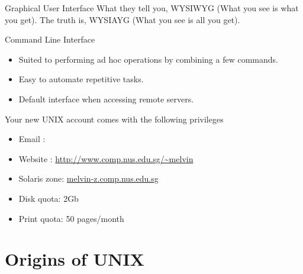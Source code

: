 


\begin{frame}
\begin{block}{Graphical User Interface}
What they tell you, WYSIWYG (What you see is what you get). \pause
The truth is, WYSIAYG (What you see is all you get).
\end{block}

\pause

\begin{block}{Command Line Interface}
\begin{itemize}
\item Suited to performing ad hoc operations by combining a few commands.  
\item Easy to automate repetitive tasks.
\item Default interface when accessing remote servers.  
\end{itemize}
\end{block}
\end{frame}



\begin{frame}
Your new UNIX account comes with the following privileges
\begin{itemize}
\item Email : 
\item Website : \url{http://www.comp.nus.edu.sg/~melvin}
\item Solaris zone: \url{melvin-z.comp.nus.edu.sg}
\item Disk quota: 2Gb
\item Print quota: 50 pages/month
\end{itemize}
\end{frame}

\section{Origins of UNIX}

